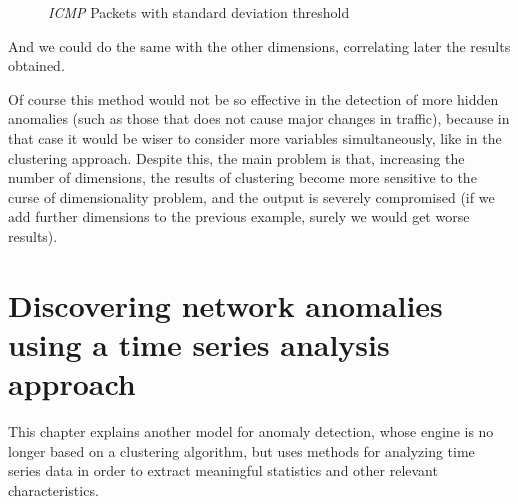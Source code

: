 \documentclass[12pt,a4paper,cucitura]{toptesi}
\begin{document}
\begin{figure}
  \centering
  \caption{\emph{ICMP} Packets with standard deviation threshold}
\end{figure}

And we could do the same with the other dimensions, correlating later the results obtained.

Of course this method would not be so effective in the detection of more hidden anomalies (such as those that does not cause major changes in traffic), because in that case it would be wiser to consider more variables simultaneously, like in the clustering approach. 
Despite this, the main problem is that, increasing the number of dimensions, the results of clustering become more sensitive to the curse of dimensionality problem, and the output is severely compromised (if we add further dimensions to the previous example, surely we would get worse results).

\chapter{Discovering network anomalies using a time series analysis approach}

This chapter explains another model for anomaly detection, whose engine is no longer based on a clustering algorithm, but uses methods for analyzing time series data in order to extract meaningful statistics and other relevant characteristics.
\end{document}
